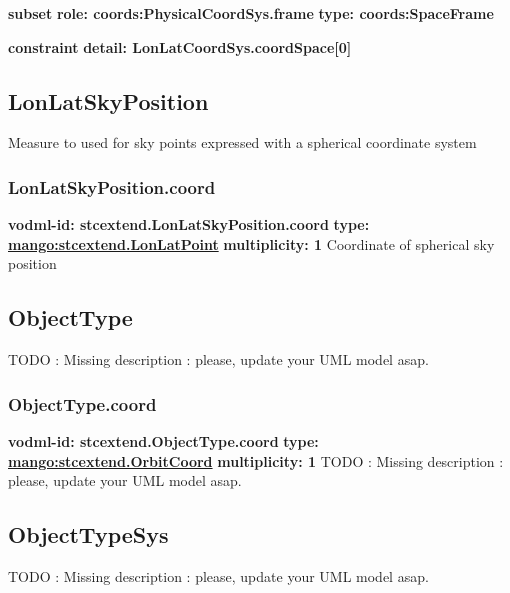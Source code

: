     \noindent \textbf{subset} \newline
    \indent   \textbf{role: coords:PhysicalCoordSys.frame} \newline
    \indent   \textbf{type: coords:SpaceFrame} \newline


    \noindent \textbf{constraint} \newline
    \indent    \textbf{detail: LonLatCoordSys.coordSpace[0] }\newline


  \subsection{LonLatSkyPosition}
  \label{sect:stcextend.LonLatSkyPosition}
    Measure to used for sky points expressed with a spherical coordinate system

    \subsubsection{LonLatSkyPosition.coord}
      \textbf{vodml-id: stcextend.LonLatSkyPosition.coord} \newline
      \textbf{type: \hyperref[sect:stcextend.LonLatPoint]{mango:stcextend.LonLatPoint}} \newline
      \textbf{multiplicity: 1} \newline 
      Coordinate of spherical sky position

  \subsection{ObjectType}
  \label{sect:stcextend.ObjectType}
    TODO : Missing description : please, update your UML model asap.

    \subsubsection{ObjectType.coord}
      \textbf{vodml-id: stcextend.ObjectType.coord} \newline
      \textbf{type: \hyperref[sect:stcextend.OrbitCoord]{mango:stcextend.OrbitCoord}} \newline
      \textbf{multiplicity: 1} \newline 
      TODO : Missing description : please, update your UML model asap.

  \subsection{ObjectTypeSys}
  \label{sect:stcextend.ObjectTypeSys}
    TODO : Missing description : please, update your UML model asap.

